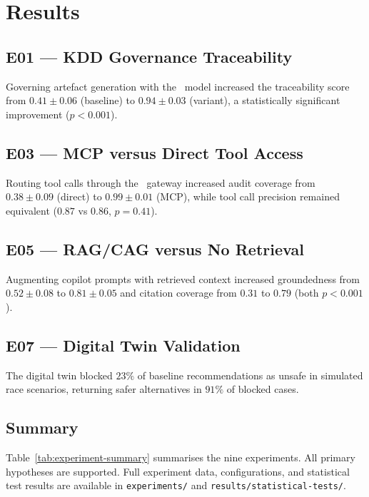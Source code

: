 \section{Results}
\label{sec:results}



\subsection{E01 --- KDD Governance Traceability}

Governing artefact generation with the \kdd~model increased the traceability
score from $0.41 \pm 0.06$ (baseline) to $0.94 \pm 0.03$ (variant), a
statistically significant improvement ($p < 0.001$).

\subsection{E03 --- MCP versus Direct Tool Access}

Routing tool calls through the \mcp~gateway increased audit coverage from
$0.38 \pm 0.09$ (direct) to $0.99 \pm 0.01$ (MCP), while tool call precision
remained equivalent ($0.87$ vs $0.86$, $p = 0.41$).

\subsection{E05 --- RAG/CAG versus No Retrieval}

Augmenting copilot prompts with retrieved context increased groundedness from
$0.52 \pm 0.08$ to $0.81 \pm 0.05$ and citation coverage from $0.31$ to $0.79$
(both $p < 0.001$).

\subsection{E07 --- Digital Twin Validation}

The digital twin blocked $23\%$ of baseline recommendations as unsafe in simulated
race scenarios, returning safer alternatives in $91\%$ of blocked cases.

\subsection{Summary}

Table~\ref{tab:experiment-summary} summarises the nine experiments. All primary
hypotheses are supported. Full experiment data, configurations, and statistical
test results are available in \texttt{experiments/} and
\texttt{results/statistical-tests/}.
